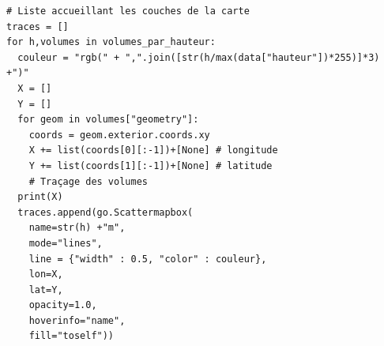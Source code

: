 \documentclass[
  11pt,
  french,
]{article}
\begin{document}
\begin{tcolorbox}[title= Répartition des volumes selon leurs caractéristiques ,colback=boitecode]
\begin{lstlisting}[style=code]
# Liste accueillant les couches de la carte
traces = []
for h,volumes in volumes_par_hauteur:
  couleur = "rgb(" + ",".join([str(h/max(data["hauteur"])*255)]*3) +")"
  X = []
  Y = []
  for geom in volumes["geometry"]:
    coords = geom.exterior.coords.xy
    X += list(coords[0][:-1])+[None] # longitude
    Y += list(coords[1][:-1])+[None] # latitude
    # Traçage des volumes
  print(X)
  traces.append(go.Scattermapbox(
    name=str(h) +"m",
    mode="lines",
    line = {"width" : 0.5, "color" : couleur},
    lon=X,
    lat=Y,
    opacity=1.0,
    hoverinfo="name",
    fill="toself"))\end{lstlisting}


\end{tcolorbox}
\end{document}
